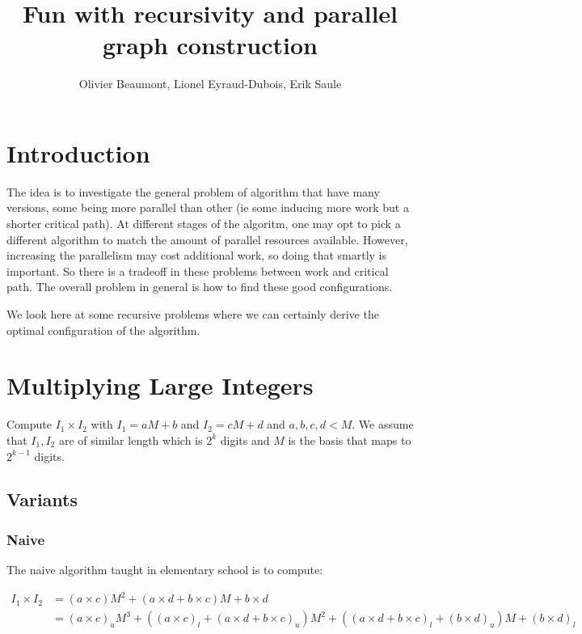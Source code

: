 \documentclass{article}
\author{Olivier Beaumont, Lionel Eyraud-Dubois, Erik Saule}
\title{Fun with recursivity and parallel graph construction}
\begin{document}
\maketitle

\section{Introduction}

The idea is to investigate the general problem of algorithm that have
many versions, some being more parallel than other (ie some inducing
more work but a shorter critical path). At different stages of the
algoritm, one may opt to pick a different algorithm to match the
amount of parallel resources available. However, increasing the
parallelism may cost additional work, so doing that smartly is
important. So there is a tradeoff in these problems between work and
critical path. The overall problem in general is how to find these
good configurations.

We look here at some recursive problems where we can certainly derive
the optimal configuration of the algorithm.

\section{Multiplying Large Integers}

Compute $I_1 \times I_2$ with $I_1 = aM + b$ and $I_2 = cM + d$ and
$a,b,c,d < M$. We assume that $I_1, I_2$ are of similar length which
is $2^k$ digits and $M$ is the basis that maps to $2^{k-1}$ digits.

\subsection{Variants}

\subsubsection{Naive}

The naive algorithm taught in elementary school is to compute:

\begin{align}
  I_1 \times I_2 & = (a\times c) M^2 + (a \times d + b \times c ) M + b\times d \\
            & = (a\times c)_{u} M^3 + ((a\times c)_{l} + (a \times d + b \times c )_{u}) M^2 + ( (a \times d + b \times c )_{l} + (b\times d)_{u} ) M + (b\times d)_{l}
\end{align}
\end{document}
